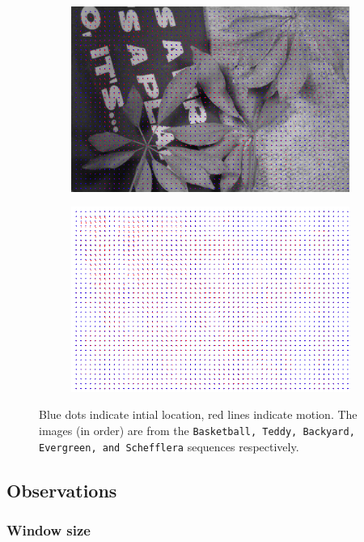 \documentclass[a4paper,11]{article}
\begin{document}
\begin{figure}[H]
  \begin{subfigure}{0.5\textwidth}
   \centering
   \includegraphics[width=0.8\linewidth]{Schefflera/result_31x31.png}
   \end{subfigure}
   \begin{subfigure}{0.5\textwidth}
    \centering
    \includegraphics[width=0.8\linewidth]{Schefflera/flow_31x31.png}
   \end{subfigure}
   
   
  \caption{Blue dots indicate intial location, red lines indicate motion. The images (in order) are from the \texttt{Basketball, Teddy, Backyard, Evergreen, and Schefflera} sequences respectively.}
 
\end{figure}
  
     
\subsection{Observations}
\subsubsection*{Window size}
\end{document}
